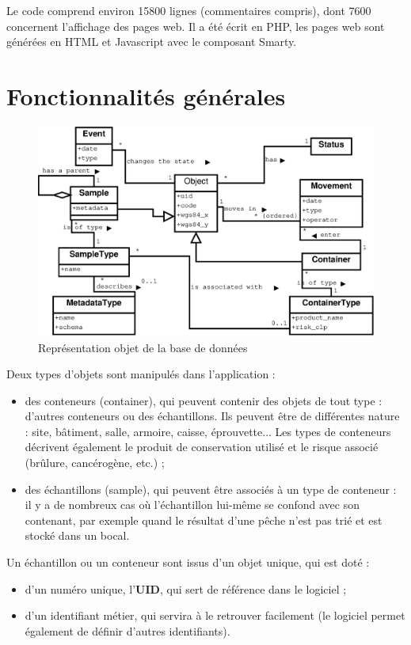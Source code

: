 Le code comprend environ 15800 lignes (commentaires compris), dont 7600 concernent l'affichage des pages web. Il a été écrit en PHP, les pages web sont générées en HTML et Javascript avec le composant Smarty.

\section{Fonctionnalités générales}

\begin{figure}[H]
\includegraphics[width=\linewidth]{images/classes2}
\caption{Représentation objet de la base de données}
\end{figure}


Deux types d'objets sont manipulés dans l'application :
\begin{itemize}
\item des conteneurs (container), qui peuvent contenir des objets de tout type : d'autres conteneurs ou des échantillons. Ils peuvent être de différentes nature : site, bâtiment, salle, armoire, caisse, éprouvette... Les types de conteneurs décrivent également le produit de conservation utilisé et le risque associé (brûlure, cancérogène, etc.) ;
\item des échantillons (sample), qui peuvent être associés à un type de conteneur : il y a de nombreux cas où l'échantillon lui-même se confond avec son contenant, par exemple quand le résultat d'une pêche n'est pas trié et est stocké dans un bocal.
\end{itemize}

Un échantillon ou un conteneur sont issus d'un objet unique, qui est doté :
\begin{itemize}
\item d'un numéro unique, l'\textbf{UID}, qui sert de référence dans le logiciel ;
\item d'un identifiant métier, qui servira à le retrouver facilement (le logiciel permet également de définir d'autres identifiants).
\end{itemize}

